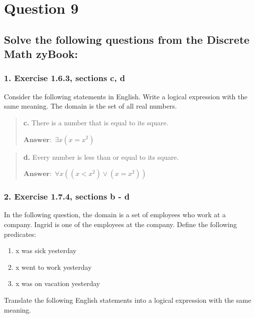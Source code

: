 \documentclass[11pt, oneside]{article}
\begin{document}
\pagebreak

\section*{Question 9}

\subsection*{Solve the following questions from the Discrete Math zyBook:}

\subsubsection*{1. Exercise 1.6.3, sections c, d}

Consider the following statements in English. Write a logical expression with the same meaning. The domain is the set of all real numbers.

\begin{quote}
    \textbf{c. }There is a number that is equal to its square.

    \(\textbf{Answer:}\enspace \exists x(x = x^2)\)
\end{quote}

\begin{quote}
    \textbf{d. }Every number is less than or equal to its square.

    \(\textbf{Answer:}\enspace \forall x((x < x^2) \lor (x = x^2))\)
\end{quote}

\subsubsection*{2. Exercise 1.7.4, sections b - d}

In the following question, the domain is a set of employees who work at a company. Ingrid is one of the employees at the company. Define the following predicates:

\begin{enumerate}
    \item[S(x):] x was sick yesterday
    \item[W(x):] x went to work yesterday
    \item[V(x):] x was on vacation yesterday
\end{enumerate}

Translate the following English statements into a logical expression with the same meaning.
\end{document}
